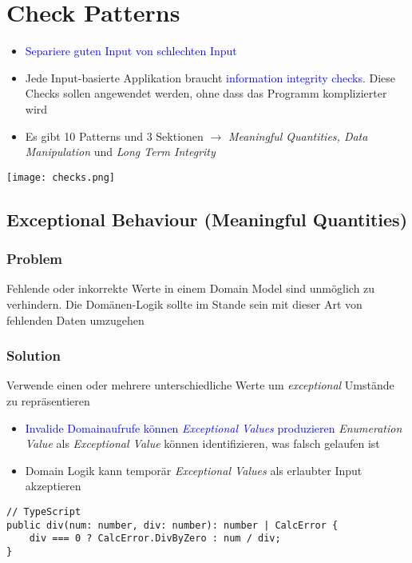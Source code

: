 \section{Check Patterns}

\begin{itemize}
    \item \textcolor{blue}{Separiere guten Input von schlechten Input}
    \item Jede Input-basierte Applikation braucht \textcolor{blue}{information integrity checks}. Diese Checks sollen angewendet werden, ohne dass das Programm komplizierter wird
    \item Es gibt 10 Patterns und 3 Sektionen $\rightarrow$ \textit{Meaningful Quantities, Data Manipulation} und \textit{Long Term Integrity}
\end{itemize}

\texttt{[image: checks.png]}

\subsection{Exceptional Behaviour (Meaningful Quantities)}

\subsubsection{Problem}

Fehlende oder inkorrekte Werte in einem Domain Model sind unmöglich zu verhindern. Die Domänen-Logik
sollte im Stande sein mit dieser Art von fehlenden Daten umzugehen

\subsubsection{Solution}
Verwende einen oder mehrere unterschiedliche Werte um \textit{exceptional} Umstände zu repräsentieren

\begin{itemize}
    \item \textcolor{blue}{Invalide Domainaufrufe können \textit{Exceptional Values} produzieren} \textit{Enumeration Value} als \textit{Exceptional Value} können identifizieren, was falsch gelaufen ist
    \item Domain Logik kann temporär \textit{Exceptional Values} als erlaubter Input akzeptieren
\end{itemize}
\begin{lstlisting}
// TypeScript
public div(num: number, div: number): number | CalcError {
    div === 0 ? CalcError.DivByZero : num / div;
}
\end{lstlisting}


